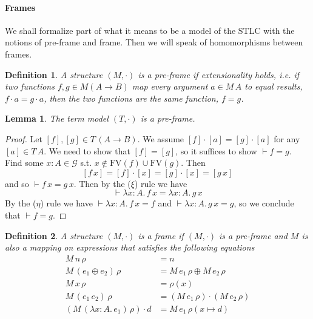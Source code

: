 \documentclass{tufte-handout}
\newcommand{\LAM}[1]{\lambda #1.\,}
\newcommand{\APP}[0]{\,}
\newcommand{\of}[0]{\!:\!}
\newcommand{\ext}[3]{#3(#1{\mapsto}#2)}
\newtheorem{lemma}[theorem]{Lemma}
\newtheorem{definition}{Definition}%
\begin{document}
\paragraph{Frames}

We shall formalize part of what it means to be a model of the STLC
with the notions of pre-frame and frame. Then we will speak of
homomorphisms between frames.

\begin{definition}
A structure $(M,\cdot)$ is a \emph{pre-frame} if extensionality
holds, i.e. if two functions $f,g \in M (A \to B)$ map every argument
$a \in M\,A$ to equal results, $f \cdot a = g \cdot a$, then the two
functions are the same function, $f = g$.
\end{definition}

\begin{lemma}
  The term model $(T,\cdot)$ is a pre-frame.
\end{lemma}
\begin{proof}
Let $[f],[g] \in T\,(A\to B)$.  We assume $[f] \cdot [a] = [g] \cdot
[a]$ for any $[a]\in T\,A$.  We need to show that $[f] = [g]$, so it
suffices to show $\vdash f = g$.  Find some $x : A \in \mathcal{G}$
s.t. $x \notin \mathrm{FV}(f) \cup \mathrm{FV}(g)$.  Then
\[
  [f \APP x] = [f] \cdot [x] = [g] \cdot [x] = [g \APP x]
\]
and so $\vdash f \APP x = g \APP x$. Then by the ($\xi$) rule we have
\[
\vdash \LAM{x\of A} f \APP x = \LAM{x\of A} g \APP x
\]
By the ($\eta$) rule we have $\vdash \LAM{x\of A} f \APP x = f$ and
$\vdash \LAM{x\of A} g \APP x = g$, so we conclude that $\vdash f = g$.
\end{proof}

\begin{definition}
A structure $(M,\cdot)$ is a \emph{frame} if $(M,\cdot)$ is a
pre-frame and $M$ is also a mapping on expressions that satisfies the
following equations
\begin{align*}
  M\,n\,\rho &= n \\
  M\,(e_1 \oplus e_2)\,\rho &= M\,e_1\,\rho \oplus M\,e_2\,\rho \\
  M\,x\,\rho &= \rho(x) \\
  M\,(e_1\APP e_2)\,\rho &= (M\,e_1\,\rho) \cdot (M\,e_2\,\rho) \\
  (M\,(\LAM{x\of A} e_1)\,\rho) \cdot d &=
    M\,e_1\,\ext{x}{d}{\rho}
\end{align*}
\end{definition}
\end{document}
